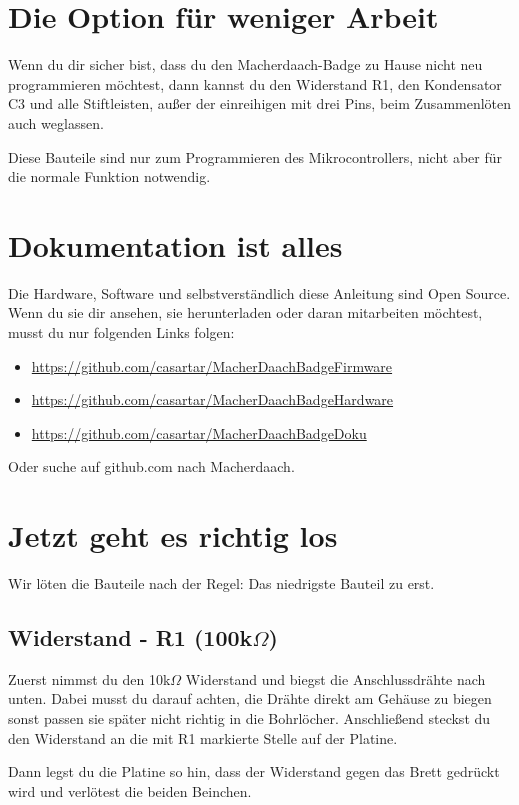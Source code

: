 \documentclass{article}
\begin{document}
\section{Die Option für weniger Arbeit}

Wenn du dir sicher bist, dass du den Macherdaach-Badge zu Hause nicht neu programmieren möchtest, dann kannst du den Widerstand R1, den Kondensator C3 und alle Stiftleisten, außer der einreihigen mit drei Pins, beim Zusammenlöten auch weglassen.

Diese Bauteile sind nur zum Programmieren des Mikrocontrollers, nicht aber für die normale Funktion notwendig.

\section{Dokumentation ist alles}

Die Hardware, Software und selbstverständlich diese Anleitung sind Open Source. Wenn du sie dir ansehen, sie herunterladen oder daran mitarbeiten möchtest, musst du nur folgenden Links folgen:

\begin{itemize}
	\item \url{https://github.com/casartar/MacherDaachBadgeFirmware}
	\item \url{https://github.com/casartar/MacherDaachBadgeHardware}
	\item \url{https://github.com/casartar/MacherDaachBadgeDoku}
\end{itemize}

Oder suche auf github.com nach Macherdaach.

\section{Jetzt geht es richtig los}
Wir löten die Bauteile nach der Regel: Das niedrigste Bauteil zu erst.

\subsection{Widerstand - R1 (100k$\Omega$)}
Zuerst nimmst du den 10k$\Omega$ Widerstand und biegst die Anschlussdrähte nach unten. Dabei musst du darauf achten, die Drähte direkt am Gehäuse zu biegen sonst passen sie später nicht richtig in die Bohrlöcher. Anschließend steckst du den Widerstand an die mit R1 markierte Stelle auf der Platine.

Dann legst du die Platine so hin, dass der Widerstand gegen das Brett gedrückt wird und verlötest die beiden Beinchen.
\end{document}
